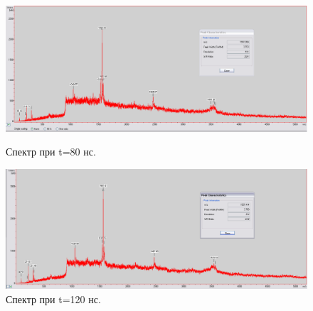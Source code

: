 \documentclass[12pt]{article}
\begin{document}
\begin{flushleft}
\begin{figure}[!h]
\begin{center}
\begin{minipage}[h]{0.4\linewidth}
\includegraphics[width=1.2\linewidth]{13}
\caption{Спектр при t=80 нс.} %
\label{ris:experimoriginal} %
\end{minipage}
\hfill 
\begin{minipage}[h]{0.4\linewidth}
\includegraphics[width=1.2\linewidth]{14}
\caption{Спектр при t=120 нс.}
\label{ris:experimcoded}
\end{minipage}
\end{center}
\end{figure}


\end{flushleft}
\end{document}
